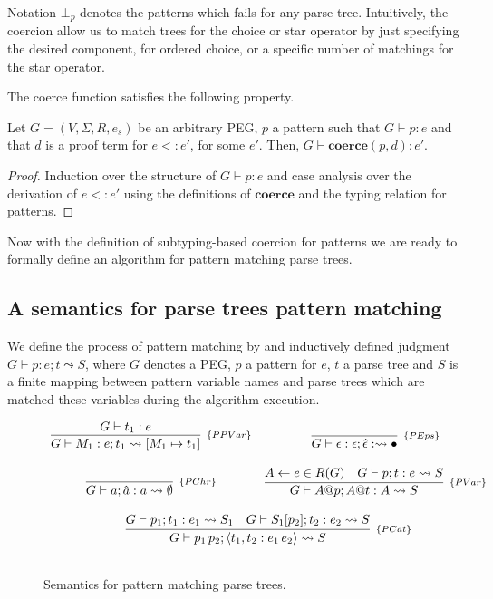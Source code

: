 Notation $\bot_p$ denotes the patterns which fails for any parse tree. Intuitively,
the coercion allow us to match trees for the choice or star operator by just specifying
the desired component, for ordered choice, or a specific number of matchings for the
star operator.

The coerce function satisfies the following property.

\begin{theorem}
  Let $G = (V,\Sigma, R, e_s)$ be an arbitrary PEG, $p$ a pattern such that
  $G\vdash p : e$ and that $d$ is a proof term for $e <: e'$, for some
  $e'$. Then, $G\vdash \mathbf{coerce}(p,d) : e'$.
\end{theorem}
\begin{proof}
  Induction over the structure of $G\vdash p : e$ and case analysis over
  the derivation of $e <: e'$ using the definitions of $\mathbf{coerce}$ and
  the typing relation for patterns.
\end{proof}

Now with the definition of subtyping-based coercion for patterns we are
ready to formally define an algorithm for pattern matching parse trees.

\subsection{A semantics for parse trees pattern matching}

We define the process of pattern matching by and inductively defined judgment
$G \vdash p : e ; t \leadsto S$, where $G$ denotes a PEG, $p$ a pattern for $e$,
$t$ a parse tree and $S$ is a finite mapping between pattern variable names and parse
trees which are matched these variables during the algorithm execution.

\begin{figure}[H]
  \[
    \begin{array}{cc}
      \infer[_{\{PPVar\}}]{G\vdash M_1 : e ; t_1 \leadsto [M_1 \mapsto t_1]}{G \vdash t_1 : e} &
      \infer[_{\{PEps\}}]{G \vdash \epsilon : \epsilon ; \hat{\epsilon} : \leadsto \bullet}{} \\ \\
      \infer[_{\{PChr\}}]{G\vdash a ; \hat{a} : a \leadsto \emptyset}{} &
      \infer[_{\{PVar\}}]{G\vdash A@p ; A@t : A \leadsto S}
                      {A \leftarrow e \in R(G) & G\vdash p ; t : e \leadsto S}\\ \\
      \multicolumn{2}{c}{
        \infer[_{\{PCat\}}]{G\vdash p_1\,p_2 ; \langle t_1, t_2 : e_1\,e_2 \rangle \leadsto S}
                        {G\vdash p_1 ; t_1 : e_1 \leadsto S_1 &
                         G\vdash S_1[p_2] ; t_2 : e_2 \leadsto S}
      } \\ \\
    \end{array}
  \]
  \centering
  \caption{Semantics for pattern matching parse trees.}
  \label{fig:pattern-semantics}
\end{figure}

